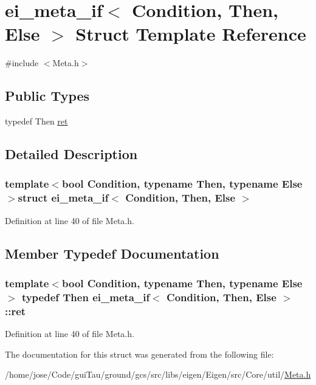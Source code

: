 \hypertarget{structei__meta__if}{\section{ei\-\_\-meta\-\_\-if$<$ Condition, Then, Else $>$ Struct Template Reference}
\label{structei__meta__if}
}


{\ttfamily \#include $<$Meta.\-h$>$}

\subsection*{Public Types}
\begin{DoxyCompactItemize}
\item 
typedef Then \hyperlink{structei__meta__if_ac2ed324df1c180a44bc45772a5b0720b}{ret}
\end{DoxyCompactItemize}


\subsection{Detailed Description}
\subsubsection*{template$<$bool Condition, typename Then, typename Else$>$struct ei\-\_\-meta\-\_\-if$<$ Condition, Then, Else $>$}



Definition at line 40 of file Meta.\-h.



\subsection{Member Typedef Documentation}
\hypertarget{structei__meta__if_ac2ed324df1c180a44bc45772a5b0720b}{
\subsubsection[{ret}]{\setlength{\rightskip}{0pt plus 5cm}template$<$bool Condition, typename Then, typename Else$>$ typedef Then {\bf ei\-\_\-meta\-\_\-if}$<$ Condition, Then, Else $>$\-::{\bf ret}}}\label{structei__meta__if_ac2ed324df1c180a44bc45772a5b0720b}


Definition at line 40 of file Meta.\-h.



The documentation for this struct was generated from the following file\-:\begin{DoxyCompactItemize}
\item 
/home/jose/\-Code/gui\-Tau/ground/gcs/src/libs/eigen/\-Eigen/src/\-Core/util/\hyperlink{_meta_8h}{Meta.\-h}\end{DoxyCompactItemize}

